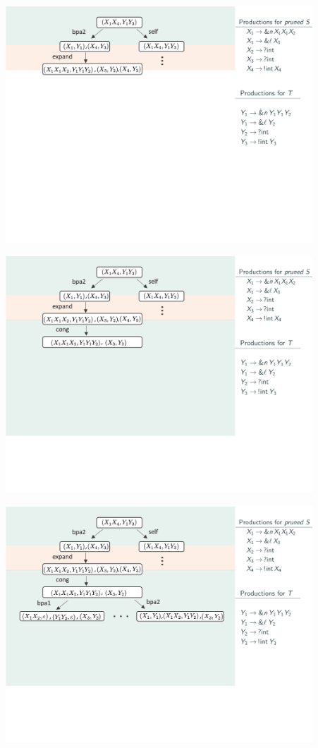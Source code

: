 \documentclass[10pt]{beamer}
\begin{document}
\begin{frame}
	\includegraphics[width=11.5cm]{img/exemplo-7}\smallskip
\end{frame}

\begin{frame}
	\includegraphics[width=11.5cm]{img/exemplo-6}\smallskip
\end{frame}

\begin{frame}
	\includegraphics[width=11.5cm]{img/exemplo-5}\smallskip
\end{frame}
\end{document}

